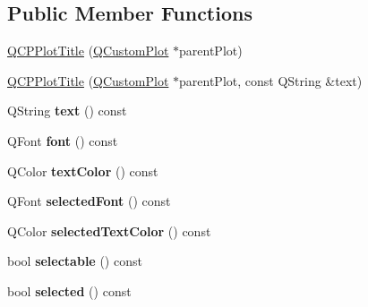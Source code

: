 \subsection*{Public Member Functions}
\begin{DoxyCompactItemize}
\item 
\hyperlink{classQCPPlotTitle_aaae17bee2de6d6a1e695f76fb1abed03}{Q\+C\+P\+Plot\+Title} (\hyperlink{classQCustomPlot}{Q\+Custom\+Plot} $\ast$parent\+Plot)
\item 
\hyperlink{classQCPPlotTitle_a90b9f46ceccbeee41f71c895a8c7ee1f}{Q\+C\+P\+Plot\+Title} (\hyperlink{classQCustomPlot}{Q\+Custom\+Plot} $\ast$parent\+Plot, const Q\+String \&text)
\item 
\hypertarget{classQCPPlotTitle_aeaa6f2384a611e8a610262b976b3cee5}{}Q\+String {\bfseries text} () const \label{classQCPPlotTitle_aeaa6f2384a611e8a610262b976b3cee5}

\item 
\hypertarget{classQCPPlotTitle_aa5f4cf007db51ccdd1c137191f564119}{}Q\+Font {\bfseries font} () const \label{classQCPPlotTitle_aa5f4cf007db51ccdd1c137191f564119}

\item 
\hypertarget{classQCPPlotTitle_a69f2cae768ff84dbf9f8a387ad617781}{}Q\+Color {\bfseries text\+Color} () const \label{classQCPPlotTitle_a69f2cae768ff84dbf9f8a387ad617781}

\item 
\hypertarget{classQCPPlotTitle_aa865a3656e01ee8db41837afa892f2a3}{}Q\+Font {\bfseries selected\+Font} () const \label{classQCPPlotTitle_aa865a3656e01ee8db41837afa892f2a3}

\item 
\hypertarget{classQCPPlotTitle_ab2262e40edfc41540c1dbc1c4234f9d2}{}Q\+Color {\bfseries selected\+Text\+Color} () const \label{classQCPPlotTitle_ab2262e40edfc41540c1dbc1c4234f9d2}

\item 
\hypertarget{classQCPPlotTitle_a8d75c7cbcf2049c9512a3335d6f11416}{}bool {\bfseries selectable} () const \label{classQCPPlotTitle_a8d75c7cbcf2049c9512a3335d6f11416}

\item 
\hypertarget{classQCPPlotTitle_a9771f3a4bca026484d7c8b5d953b5e82}{}bool {\bfseries selected} () const \label{classQCPPlotTitle_a9771f3a4bca026484d7c8b5d953b5e82}


\end{DoxyCompactItemize}
